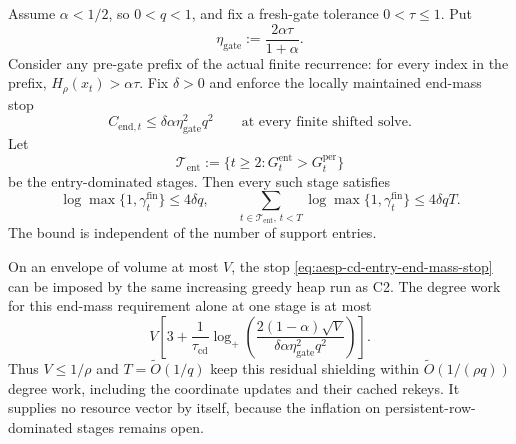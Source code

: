 \begin{corollary}
\label{cor:aesp-cd-entry-inflation-ledger}
Assume $\alpha<1/2$, so $0<q<1$, and fix a fresh-gate tolerance
$0<\tau\leq1$.  Put
\begin{equation*}
 \eta_{\mathrm{gate}}:=\frac{2\alpha\tau}{1+\alpha}.
\end{equation*}
Consider any pre-gate prefix of the actual finite recurrence: for every
index in the prefix,
$H_\rho(x_t)>\alpha\tau$.  Fix $\delta>0$ and enforce the locally
maintained end-mass stop
\begin{equation}
 C_{\mathrm{end},t}
 \leq\delta\alpha\eta_{\mathrm{gate}}^2q^2
 \qquad\text{at every finite shifted solve.}
 \label{eq:aesp-cd-entry-end-mass-stop}
\end{equation}
Let
\begin{equation*}
 \mathcal T_{\mathrm{ent}}
 :=\{t\geq2:G_t^{\mathrm{ent}}>G_t^{\mathrm{per}}\}
\end{equation*}
be the entry-dominated stages.  Then every such stage satisfies
\begin{equation}
 \log\max\{1,\gamma_t^{\mathrm{fin}}\}\leq4\delta q,
 \qquad
 \sum_{t\in\mathcal T_{\mathrm{ent}},\,t<T}
 \log\max\{1,\gamma_t^{\mathrm{fin}}\}
 \leq4\delta qT.
 \label{eq:aesp-cd-entry-inflation-bound}
\end{equation}
The bound is independent of the number of support entries.

On an envelope of volume at most $V$, the stop
\cref{eq:aesp-cd-entry-end-mass-stop} can be imposed by the same increasing
greedy heap run as C2.  The degree work for this end-mass requirement alone
at one stage is at most
\begin{equation}
 V\left[3+\frac1{\tau_{\mathrm{cd}}}
 \log_+\left(
 \frac{2(1-\alpha)\sqrt V}
      {\delta\alpha\eta_{\mathrm{gate}}^2q^2}
 \right)\right].
 \label{eq:aesp-cd-entry-polish-work}
\end{equation}
Thus $V\leq1/\rho$ and $T=\widetilde O(1/q)$ keep this residual shielding
within $\widetilde O(1/(\rho q))$ degree work, including the coordinate
updates and their cached rekeys.  It supplies no resource vector by itself,
because the inflation on persistent-row-dominated stages remains open.
\end{corollary}

